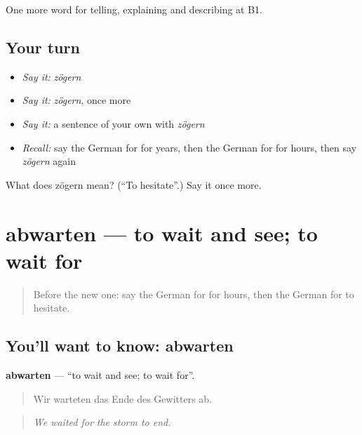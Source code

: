\begin{grammarlens}[title={What you've built}]
One more word for telling, explaining and describing at B1.
\end{grammarlens}

\subsection*{Your turn}
\begin{itemize}
\raggedright
  \item \emph{Say it:} \emph{zögern}
  \item \emph{Say it:} \emph{zögern}, once more
  \item \emph{Say it:} a sentence of your own with \emph{zögern}
  \item \emph{Recall:} say the German for for years, then the German for for hours, then say \emph{zögern} again
\end{itemize}

\begin{tcolorbox}[breakable,colback=teal!4,colframe=teal!35!black,title={Before you move on}]
What does zögern mean? (\textquotedblleft{}To hesitate\textquotedblright{}.) Say it once more.
\end{tcolorbox}
\section[abwarten]{abwarten — to wait and see; to wait for}

\label{lesson:GE-C270-abwarten}



\begin{quote}
Before the new one: say the German for for hours, then the German for to hesitate.
\end{quote}

\subsection*{You'll want to know: abwarten}
\textbf{abwarten} — \textquotedblleft{}to wait and see; to wait for\textquotedblright{}.

\begin{quote}
Wir warteten das Ende des Gewitters ab.
\end{quote}

\begin{quote}
\emph{We waited for the storm to end.}
\end{quote}

